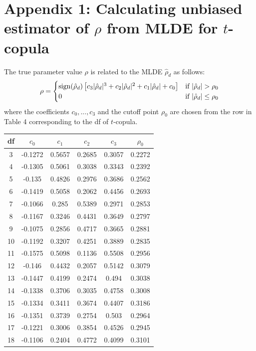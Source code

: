 \documentclass[11pt]{llncs}
\begin{document}
\section*{Appendix 1: Calculating unbiased estimator of $\rho$ from MLDE for $t$-copula}
The true parameter value $\rho$ is related to the MLDE $\hat\rho_d$ as follows:
$$ \rho = \begin{cases}
\operatorname*{sign}(\hat\rho_d)\left[c_3|\hat\rho_d|^3 + c_2|\hat\rho_d|^2 + c_1|\hat\rho_d| + c_0\right]
&\mbox{if } |\hat\rho_d| > \rho_0\\ 0 &\mbox{if }|\hat\rho_d| \leq \rho_0 
\end{cases}$$
where the coefficients $c_0, ... , c_3$ and the cutoff point $\rho_0$ are chosen from the row in Table 4 corresponding to the df of $t$-copula.
\begin{table}[h]\centering
    \begin{tabular}{c|ccccc}
    \hline
     df & $\quad c_0\quad$      & $\quad c_1\quad$     & $\quad c_2\quad$     & $\quad c_3\quad$     & $\rho_0$  \\ \hline
    3   & -0.1272 & 0.5657 & 0.2685 & 0.3057 & 0.2272 \\
    4   & -0.1305 & 0.5061 & 0.3038 & 0.3343 & 0.2392 \\
    5   & -0.135  & 0.4826 & 0.2976 & 0.3686 & 0.2562 \\
    6   & -0.1419 & 0.5058 & 0.2062 & 0.4456 & 0.2693 \\
    7   & -0.1066 & 0.285  & 0.5389 & 0.2971 & 0.2853 \\
    8   & -0.1167 & 0.3246 & 0.4431 & 0.3649 & 0.2797 \\
    9   & -0.1075 & 0.2856 & 0.4717 & 0.3665 & 0.2881 \\
    10  & -0.1192 & 0.3207 & 0.4251 & 0.3889 & 0.2835 \\
    11  & -0.1575 & 0.5098 & 0.1136 & 0.5508 & 0.2956 \\
    12  & -0.146  & 0.4432 & 0.2057 & 0.5142 & 0.3079 \\
    13  & -0.1447 & 0.4199 & 0.2474 & 0.494  & 0.3038 \\
    14  & -0.1338 & 0.3706 & 0.3035 & 0.4758 & 0.3008 \\
    15  & -0.1334 & 0.3411 & 0.3674 & 0.4407 & 0.3186 \\
    16  & -0.1351 & 0.3739 & 0.2754 & 0.503  & 0.2964 \\
    17  & -0.1221 & 0.3006 & 0.3854 & 0.4526 & 0.2945 \\
    18  & -0.1106 & 0.2404 & 0.4772 & 0.4099 & 0.3101 \\

\end{tabular}
\end{table}
\end{document}
